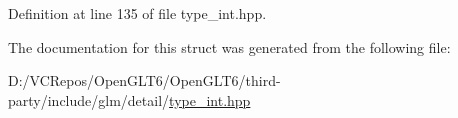 Definition at line 135 of file type\+\_\+int.\+hpp.



The documentation for this struct was generated from the following file\+:\begin{DoxyCompactItemize}
\item 
D\+:/\+V\+C\+Repos/\+Open\+G\+L\+T6/\+Open\+G\+L\+T6/third-\/party/include/glm/detail/\mbox{\hyperlink{type__int_8hpp}{type\+\_\+int.\+hpp}}\end{DoxyCompactItemize}
